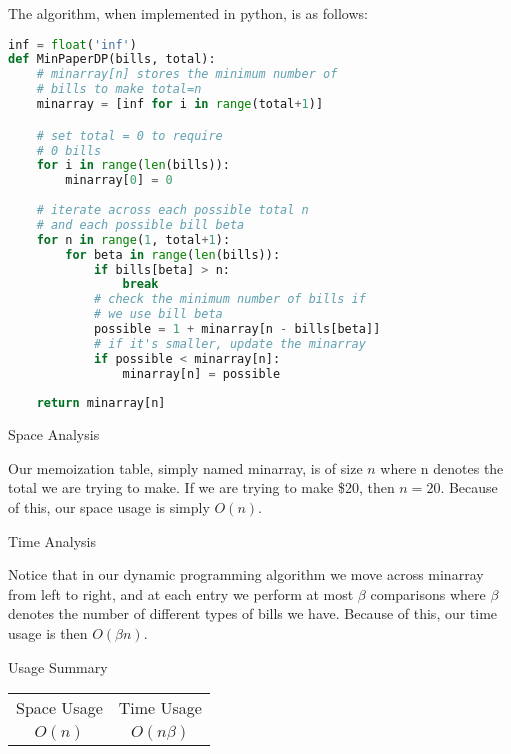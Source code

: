 \documentclass[11pt, letterpaper]{article}
\begin{document}
\begin{enumerate}
\begin{center}
The algorithm, when implemented in python, is as follows:
\end{center}

\begin{lstlisting}[language=python]
inf = float('inf')
def MinPaperDP(bills, total):
    # minarray[n] stores the minimum number of 
    # bills to make total=n
    minarray = [inf for i in range(total+1)]

    # set total = 0 to require
    # 0 bills
    for i in range(len(bills)):
        minarray[0] = 0
    
    # iterate across each possible total n
    # and each possible bill beta
    for n in range(1, total+1):
        for beta in range(len(bills)):
            if bills[beta] > n:
                break
            # check the minimum number of bills if
            # we use bill beta
            possible = 1 + minarray[n - bills[beta]]
            # if it's smaller, update the minarray
            if possible < minarray[n]:
                minarray[n] = possible
    
    return minarray[n]
\end{lstlisting}

\pagebreak

\begin{center}
Space Analysis
\end{center}

\quad Our memoization table, simply named minarray, is of size $n$ where n denotes the total we are trying to make. If we are trying to make \$20, then $n = 20$. Because of this, our space usage is simply $O(n)$.

\begin{center}
Time Analysis
\end{center}

\quad Notice that in our dynamic programming algorithm we move across minarray from left to right, and at each entry we perform at most $\beta$ comparisons where $\beta$ denotes the number of different types of bills we have. Because of this, our time usage is then $O(\beta n)$.

\begin{center}
Usage Summary \\
\begin{tabular}{c c}
Space Usage & Time Usage \\
$O(n)$ & $O(n \beta)$ \\
\end{tabular}
\end{center}

\end{enumerate}
\end{document}

